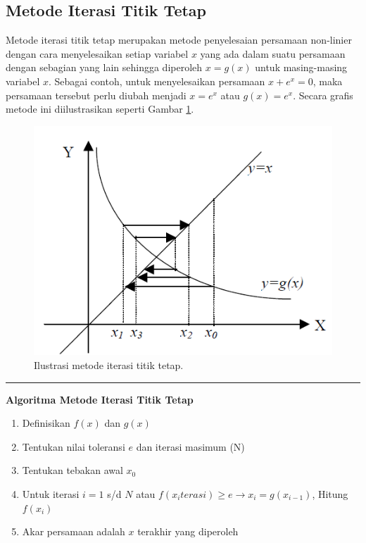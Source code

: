 \documentclass[]{book}
\providecommand{\tightlist}{%
  \setlength{\itemsep}{0pt}\setlength{\parskip}{0pt}}
\theoremstyle{definition}
\theoremstyle{definition}
\theoremstyle{definition}
\theoremstyle{remark}
\begin{document}
\hypertarget{fixpoint}{%
\subsection{Metode Iterasi Titik Tetap}\label{fixpoint}}

Metode iterasi titik tetap merupakan metode penyelesaian persamaan non-linier dengan cara menyelesaikan setiap variabel \(x\) yang ada dalam suatu persamaan dengan sebagian yang lain sehingga diperoleh \(x=g\left(x \right)\) untuk masing-masing variabel \(x\). Sebagai contoh, untuk menyelesaikan persamaan \(x+e^{x}=0\), maka persamaan tersebut perlu diubah menjadi \(x=e^x\) atau \(g\left(x \right)=e^x\). Secara grafis metode ini diilustrasikan seperti Gambar \ref{fig:fixpointiter}.

\begin{figure}

{\centering \includegraphics[width=0.8\linewidth]{./images/fixpointiter} 

}

\caption{Ilustrasi metode iterasi titik tetap.}\label{fig:fixpointiter}
\end{figure}

\begin{center}\rule{0.5\linewidth}{\linethickness}\end{center}

\textbf{Algoritma Metode Iterasi Titik Tetap}

\begin{enumerate}
\def\labelenumi{\arabic{enumi}.}
\tightlist
\item
  Definisikan \(f\left(x \right)\) dan \(g\left(x \right)\)
\item
  Tentukan nilai toleransi \(e\) dan iterasi masimum (N)
\item
  Tentukan tebakan awal \(x_0\)
\item
  Untuk iterasi \(i=1\) s/d \(N\) atau \(f\left(x_iterasi \right)\ge e \to x_i=g\left(x_{i-1} \right)\), Hitung \(f\left(x_i \right)\)
\item
  Akar persamaan adalah \(x\) terakhir yang diperoleh
\end{enumerate}
\end{document}
